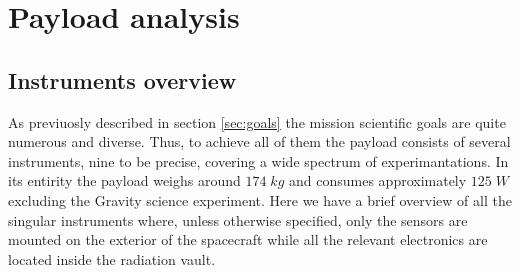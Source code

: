 \section{Payload analysis}
\label{sec:payload}

\subsection{Instruments overview}
As previuosly described in section \ref{sec:goals} the mission scientific goals are quite numerous and diverse. Thus, to achieve all of them the payload consists of several instruments, nine to be precise, covering a wide spectrum of experimantations. In its entirity the payload weighs around $174 \;kg$ and consumes approximately $125 \;W$ excluding the Gravity science experiment. %
Here we have a brief overview of all the singular instruments where, unless otherwise specified, only the sensors are mounted on the exterior of the spacecraft while all the relevant electronics are located inside the radiation vault. 

